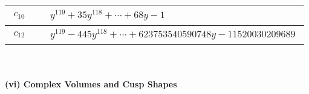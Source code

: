 \documentclass[1p]{elsarticle_modified}
\theoremstyle{definition}
\begin{document}
\begin{tabular}{m{50pt}|m{274pt}}
\hline $$\begin{aligned}c_{10}\end{aligned}$$&$\begin{aligned}
&y^{119}+35 y^{118}+\cdots+68 y-1
\end{aligned}$\\
\hline $$\begin{aligned}c_{12}\end{aligned}$$&$\begin{aligned}
&y^{119}-445 y^{118}+\cdots+623753540590748 y-11520030209689
\end{aligned}$\\
\hline
\end{tabular}\\~\\
\newpage\flushleft \textbf{(vi) Complex Volumes and Cusp Shapes}
\end{document}
